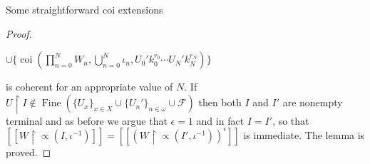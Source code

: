 \documentclass{amsart}
\theoremstyle{definition}\newtheorem{theorem}{Theorem}
\theoremstyle{definition}\newtheorem*{A}{Main Theorem}
\theoremstyle{definition}\newtheorem*{B}{Theorem \ref{elementaryequiv}}
\theoremstyle{definition}\newtheorem*{C}{Theorem \ref{continuous}}
\theoremstyle{definition}\newtheorem*{D}{Theorem \ref{bigisomorphism2}}
\theoremstyle{definition}\newtheorem{bigtheorem}{Main Theorem}
\numberwithin{theorem}{section}
\theoremstyle{definition}\newtheorem{corollary}[theorem]{Corollary}
\theoremstyle{definition}\newtheorem{proposition}[theorem]{Proposition}
\theoremstyle{definition}\newtheorem{definition}[theorem]{Definition}
\theoremstyle{definition}\newtheorem{question}[theorem]{Question}
\theoremstyle{definition}\newtheorem{example}[theorem]{Example}
\theoremstyle{definition}\newtheorem{remark}[theorem]{Remark}
\theoremstyle{definition}\newtheorem{note}[theorem]{Note}
\theoremstyle{definition}\newtheorem{lemma}[theorem]{Lemma}
\theoremstyle{definition}\newtheorem{fact}[theorem]{Fact}
\theoremstyle{definition}\newtheorem{define}[theorem]{Definition}
\theoremstyle{definition}\newtheorem{claim}[theorem]{Claim}
\theoremstyle{definition}\newtheorem{obs}[theorem]{Observation}
\theoremstyle{definition}\newtheorem{definitions}[theorem]{Definitions}
\newcommand{\Fine}{\operatorname{Fine}}
\newcommand{\coi}{\operatorname{coi}}
\begin{document}
\begin{section}{Some straightforward coi extensions}
\begin{proof}
\begin{center}
 $\cup \{\coi(\prod_{n = 0}^NW_n, \bigcup_{n = 0}^N \iota_n , U_0'k_0^{r_0}\cdots U_N'k_N^{r_N})\}$
\end{center}

\noindent is coherent for an appropriate value of $N$.  If $U \upharpoonright I \notin \Fine(\{U_x\}_{x \in X} \cup \{U_n'\}_{n \in \omega} \cup \mathcal{F})$ then both $I$ and $I'$ are nonempty terminal and as before we argue that $\epsilon = 1$ and in fact $I = I'$, so that $[[W \upharpoonright \varpropto(I, \iota^{-1})]] = [[(W \upharpoonright \varpropto(I', \iota^{-1}))^{\epsilon}]]$ is immediate.  The lemma is proved.

\end{proof}

\end{section}
\end{document}

